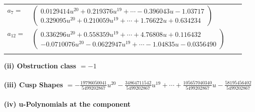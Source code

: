 \documentclass[1p]{elsarticle_modified}
\theoremstyle{definition}
\begin{document}
\begin{tabular}{m{7pt} m{180pt} m{7pt} m{180pt} }
\flushright $a_{7}=$&$\begin{pmatrix}0.0129414 u^{20}+0.219376 u^{19}+\cdots-0.396043 u-1.03717\\0.329095 u^{20}+0.210059 u^{19}+\cdots+1.76622 u+0.634234\end{pmatrix}$ \\
\flushright $a_{12}=$&$\begin{pmatrix}0.336296 u^{20}+0.558359 u^{19}+\cdots+4.76808 u+0.116432\\-0.0710076 u^{20}-0.0622947 u^{19}+\cdots-1.04835 u-0.0356490\end{pmatrix}$\\&\end{tabular}
\flushleft \textbf{(ii) Obstruction class $= -1$}\\~\\
\flushleft \textbf{(iii) Cusp Shapes $= -\frac{19796050041}{5499202867} u^{20}-\frac{34864711542}{5499202867} u^{19}+\cdots+\frac{105657040340}{5499202867} u-\frac{58195456402}{5499202867}$}\\~\\
\newpage\renewcommand{\arraystretch}{1}
\flushleft \textbf{(iv) u-Polynomials at the component}\newline \\
\end{document}
